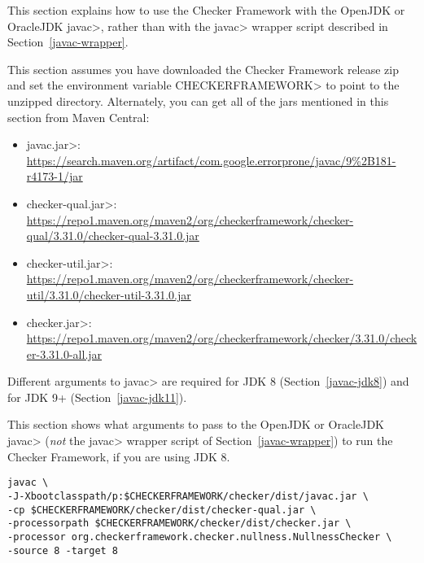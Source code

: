
This section explains how to use the Checker Framework with the OpenJDK or
OracleJDK \<javac>, rather than with the \<javac> wrapper script described in
Section~\ref{javac-wrapper}.

This
section assumes you have downloaded the Checker Framework release zip and set
the environment variable \<CHECKERFRAMEWORK> to point to the unzipped directory.
Alternately, you can get all of the jars mentioned in this section from Maven Central:

\begin{itemize}
\item \<javac.jar>: \url{https://search.maven.org/artifact/com.google.errorprone/javac/9%2B181-r4173-1/jar}
\item \<checker-qual.jar>: \url{https://repo1.maven.org/maven2/org/checkerframework/checker-qual/3.31.0/checker-qual-3.31.0.jar}
\item \<checker-util.jar>: \url{https://repo1.maven.org/maven2/org/checkerframework/checker-util/3.31.0/checker-util-3.31.0.jar}
\item \<checker.jar>: \url{https://repo1.maven.org/maven2/org/checkerframework/checker/3.31.0/checker-3.31.0-all.jar}
\end{itemize}

Different arguments to \<javac> are required for JDK 8
(Section~\ref{javac-jdk8}) and for JDK 9+ (Section~\ref{javac-jdk11}).



This section shows what arguments to pass to the OpenJDK or OracleJDK
\<javac> (\emph{not} the \<javac> wrapper script of
Section~\ref{javac-wrapper}) to run the Checker
Framework, if you are using JDK 8.

\begin{Verbatim}
javac \
-J-Xbootclasspath/p:$CHECKERFRAMEWORK/checker/dist/javac.jar \
-cp $CHECKERFRAMEWORK/checker/dist/checker-qual.jar \
-processorpath $CHECKERFRAMEWORK/checker/dist/checker.jar \
-processor org.checkerframework.checker.nullness.NullnessChecker \
-source 8 -target 8
\end{Verbatim}

